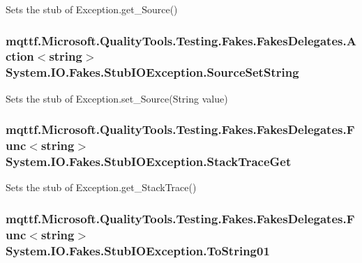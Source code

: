 Sets the stub of Exception.\-get\-\_\-\-Source()

\hypertarget{class_system_1_1_i_o_1_1_fakes_1_1_stub_i_o_exception_a446268a972c2469b6a5428bffba7230a}{
\subsubsection[{Source\-Set\-String}]{\setlength{\rightskip}{0pt plus 5cm}mqttf.\-Microsoft.\-Quality\-Tools.\-Testing.\-Fakes.\-Fakes\-Delegates.\-Action$<$string$>$ System.\-I\-O.\-Fakes.\-Stub\-I\-O\-Exception.\-Source\-Set\-String}}\label{class_system_1_1_i_o_1_1_fakes_1_1_stub_i_o_exception_a446268a972c2469b6a5428bffba7230a}


Sets the stub of Exception.\-set\-\_\-\-Source(\-String value)

\hypertarget{class_system_1_1_i_o_1_1_fakes_1_1_stub_i_o_exception_a51b6721cd233b8ec5a6dff983e9bbafa}{
\subsubsection[{Stack\-Trace\-Get}]{\setlength{\rightskip}{0pt plus 5cm}mqttf.\-Microsoft.\-Quality\-Tools.\-Testing.\-Fakes.\-Fakes\-Delegates.\-Func$<$string$>$ System.\-I\-O.\-Fakes.\-Stub\-I\-O\-Exception.\-Stack\-Trace\-Get}}\label{class_system_1_1_i_o_1_1_fakes_1_1_stub_i_o_exception_a51b6721cd233b8ec5a6dff983e9bbafa}


Sets the stub of Exception.\-get\-\_\-\-Stack\-Trace()

\hypertarget{class_system_1_1_i_o_1_1_fakes_1_1_stub_i_o_exception_a6ac4b1f5b2de3291f9a9464b80a9cc72}{
\subsubsection[{To\-String01}]{\setlength{\rightskip}{0pt plus 5cm}mqttf.\-Microsoft.\-Quality\-Tools.\-Testing.\-Fakes.\-Fakes\-Delegates.\-Func$<$string$>$ System.\-I\-O.\-Fakes.\-Stub\-I\-O\-Exception.\-To\-String01}}\label{class_system_1_1_i_o_1_1_fakes_1_1_stub_i_o_exception_a6ac4b1f5b2de3291f9a9464b80a9cc72}


